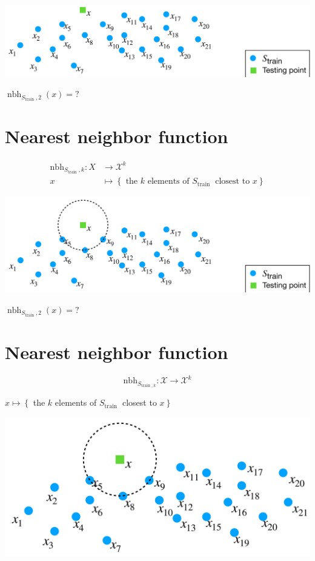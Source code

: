 \documentclass[10pt]{article}
\begin{document}
\begin{center}
\includegraphics[max width=\textwidth]{2023_12_30_f937b0007b5d87b39f79g-06}
\end{center}

$\operatorname{nbh}_{S_{\text {train }}, 2}(x)=?$

\section*{Nearest neighbor function}
$$
\begin{aligned}
\mathrm{nbh}_{S_{\text {train }}, k}: X & \rightarrow \mathscr{X}^{k} \\
x & \mapsto\left\{\text { the } k \text { elements of } S_{\text {train }} \text { closest to } x\right\}
\end{aligned}
$$

\begin{center}
\includegraphics[max width=\textwidth]{2023_12_30_f937b0007b5d87b39f79g-07}
\end{center}

$\operatorname{nbh}_{S_{\text {train }}, 2}(x)=?$

\section*{Nearest neighbor function}
$$
\mathrm{nbh}_{S_{\text {train }, k}}: \mathscr{X} \rightarrow \mathscr{X}^{k}
$$

$x \mapsto\left\{\right.$ the $k$ elements of $S_{\text {train }}$ closest to $\left.x\right\}$

\begin{center}
\includegraphics[max width=\textwidth]{2023_12_30_f937b0007b5d87b39f79g-08}
\end{center}
\end{document}
